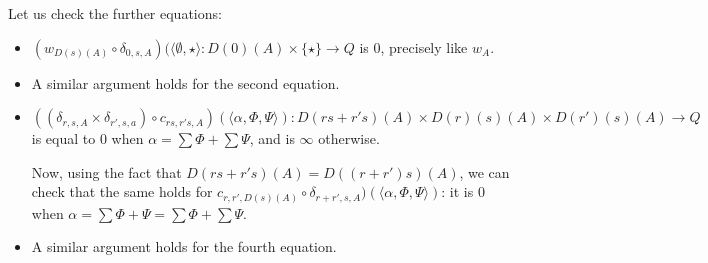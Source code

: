 Let us check the further equations:
\begin{itemize}

\item $(w_{D(s)(A)}\circ \delta_{0,s,A})(\langle \emptyset,\star\rangle: D(0)(A)\times \{\star\}\to Q$ is 0, precisely like $w_{A}$.

\item A similar argument holds for the second equation.

\item $((\delta_{r,s,A}\times \delta_{r',s,a})\circ c_{rs,r's,A})
(\langle \alpha, \Phi,\Psi  \rangle)
:
D(rs+r's)(A)\times  D(r)(s)(A)\times D(r')(s)(A)\to Q
$
is equal to $0$ when $\alpha=\sum \Phi + \sum \Psi$, and is $\infty$ otherwise.



Now, 
using the fact that $D(rs+r's)(A)=D((r+r')s)(A)$, we can check that the same holds for 
$c_{r,r',D(s)(A)}\circ \delta_{r+r',s,A})(\langle \alpha, \Phi,\Psi  \rangle)$: it is $0$ when 
$\alpha= \sum\Phi+\Psi= \sum \Phi+\sum \Psi$.


\item A similar argument holds for the fourth equation.

\end{itemize}

